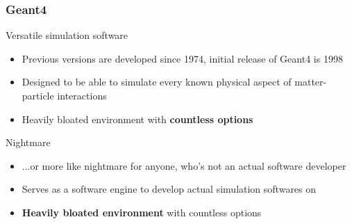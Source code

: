 \begin{frame}
\frametitle{Geant4}

\begin{block}{Versatile simulation software}
	\begin{itemize}
		\item Previous versions are developed since 1974, initial release of Geant4 is 1998
		\item Designed to be able to simulate every known physical aspect of matter-particle interactions
		\item Heavily bloated environment with \textbf{countless options}
	\end{itemize}
\end{block}

\pause

\begin{alertblock}{Nightmare}
	\begin{itemize}
		\item ...or more like nightmare for anyone, who's not an actual software developer
		\item Serves as a software engine to develop actual simulation softwares on
		\item \textbf{Heavily bloated environment} with countless options
	\end{itemize}
\end{alertblock}


\end{frame}